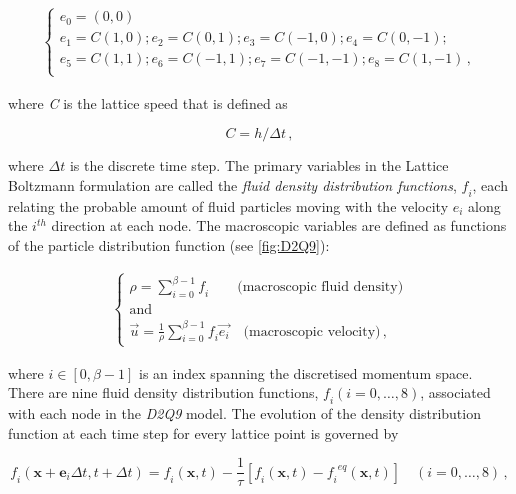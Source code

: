 \begin{align} 
	\begin{cases}
	\mathit{e_0}=(0,0)\\
	\mathit{e_1}=\mathit{C}(1,0); \mathit{e_2}=\mathit{C}(0,1); 
	\mathit{e_3}=\mathit{C}(-1,0); \mathit{e_4}=\mathit{C}(0,-1); \\
	\mathit{e_5}=\mathit{C}(1,1); \mathit{e_6}=\mathit{C}(-1,1);  
	\mathit{e_7}=\mathit{C}(-1,-1); \mathit{e_8}=\mathit{C}(1,-1)\,, \\ 
	\end{cases}
\end{align}

\noindent where \textit{C} is the lattice speed that is defined as

\begin{equation}
	\mathit{C}=\mathit{h}/\Delta t \,,
\end{equation}

\noindent where $\Delta \mathit{t}$ is the discrete time step. The primary 
variables in the Lattice Boltzmann formulation are called the \textit{fluid 
density distribution functions}, $\mathit{f_i}$, each relating the probable 
amount of fluid particles moving with the velocity $\mathit{e_i}$ along the 
$\mathit{i^{th}}$ direction at each node. The macroscopic variables are defined 
as functions of the particle distribution function (see \cref{fig:D2Q9}):

\begin{align} 
	\label{eq:lbm_macroscopic}	
	\begin{cases}
	\rho = \sum\limits_{\mathit{i}=0}^{\beta - 1}{\mathit{f_i}} \qquad 
	\mbox{(macroscopic fluid density)} \\ 
	\mbox{and}\\
	\overrightarrow{\mathit{u}} = \frac{1}{\rho} 
	\sum\limits_{\mathit{i}=0}^{\beta 
	-1}{\mathit{f_i}\overrightarrow{\mathit{e_i}}} \quad \mbox{(macroscopic 
	velocity)}\,,
	\end{cases}	
\end{align} 

\noindent where $\mathit{i} \in [0, \beta -1]$ is an index spanning the 
discretised momentum space. There are nine fluid density distribution 
functions, $\mathit{f_i}(\mathit{i}=0,\dots,8)$, associated with each node in 
the \textit{D2Q9} model. The evolution of the density distribution function at 
each time step for every lattice point is governed by

\begin{equation} 
	\label{eq:stream}
	\mathit{f_i}(\mathbf{x}+\mathbf{e}_{\mathit{i}} \Delta t, t + \Delta t) = 
	\mathit{f_i}(\mathbf{x},t) - \frac{1}{\tau} [\mathit{f_i}(\mathbf{x},t) 
	-\mathit{f_i}^{\mathit{eq}}(\mathbf{x},t)] \quad (\mathit{i}=0,\dots,8) \,,
\end{equation}

